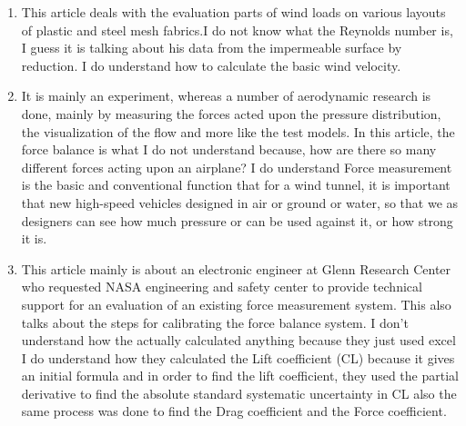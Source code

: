\documentclass[12pt,letterpaper]{article}
\begin{document}
\begin{enumerate}
	\item \cite{Hubova2019} This article deals with the evaluation parts of wind loads on various layouts of plastic and steel mesh fabrics.I do not know what the Reynolds number is, I guess it is talking about his data from the impermeable surface by reduction.
I do understand how to calculate the basic wind velocity.
	\item \cite{Yan2009} It is mainly an experiment, whereas a number of aerodynamic research is done, mainly by measuring the forces acted upon the pressure distribution, the visualization of the flow and more like the test models. 
In this article, the force balance is what I do not understand because, how are there so many different forces acting upon an airplane?
I do understand Force measurement is the basic and conventional function that for a wind tunnel, it is important that new high-speed vehicles designed in air or ground or water, so that we as designers can see how much pressure or can be used against it, or how strong it is.
	\item \cite{robert2012} This article mainly is about an electronic engineer at Glenn Research Center who requested NASA engineering and safety center to provide technical support for an evaluation of an existing force measurement system.
This also talks about the steps for calibrating the force balance system.
I don’t understand how the actually calculated anything because they just used excel
I do understand how they calculated the Lift coefficient (CL) because it gives an initial formula and in order to find the lift coefficient, they used the partial derivative to find the absolute standard systematic uncertainty in  CL also the same process was done to find the Drag coefficient and the Force coefficient.




\end{enumerate}

\printbibliography
\end{document}
